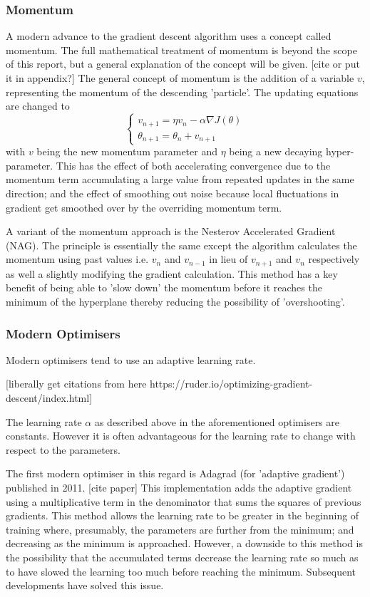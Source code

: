 \documentclass[a4paper,fleqn,usenatbib]{mnras}
\begin{document}
\subsubsection{Momentum}
A modern advance to the gradient descent algorithm uses a concept called momentum. The full mathematical treatment of momentum is beyond the scope of this report, but a general explanation of the concept will be given. [cite or put it in appendix?] The general concept of momentum is the addition of a variable $v$, representing the momentum of the descending 'particle'. The updating equations are changed to 
\begin{equation}
\begin{cases} v_{n+1}=\eta v_{n}-\alpha\nabla J(\theta)  \\ \theta_{n+1}=\theta_{n}+v_{n+1}\end{cases}
\end{equation}
with $v$ being the new momentum parameter and $\eta$ being a new decaying hyper-parameter. This has the effect of both accelerating convergence due to the momentum term accumulating a large value from repeated updates in the same direction; and the effect of smoothing out noise because local fluctuations in gradient get smoothed over by the overriding momentum term.

A variant of the momentum approach is the Nesterov Accelerated Gradient (NAG). The principle is essentially the same except the algorithm calculates the momentum using past values i.e. $v_{n}$ and $v_{n-1}$ in lieu of $v_{n+1}$ and $v_{n}$ respectively as well a slightly modifying the gradient calculation. This method has a key benefit of being able to 'slow down' the momentum before it reaches the minimum of the hyperplane thereby reducing the possibility of 'overshooting'.

\subsubsection{Modern Optimisers}
Modern optimisers tend to use an adaptive learning rate.

[liberally get citations from here https://ruder.io/optimizing-gradient-descent/index.html]

 The learning rate $\alpha$ as described above in the aforementioned optimisers are constants. However it is often advantageous for the learning rate to change with respect to the parameters.
 
 The first modern optimiser in this regard is Adagrad (for 'adaptive gradient') published in 2011. [cite paper] This implementation adds the adaptive gradient using a multiplicative term in the denominator that sums the squares of previous gradients. This method allows the learning rate to be greater in the beginning of training where, presumably, the parameters are further from the minimum; and decreasing as the minimum is approached. However, a downside to this method is the possibility that the accumulated terms decrease the learning rate so much as to have slowed the learning too much before reaching the minimum. Subsequent developments have solved this issue. 
 
\end{document}
